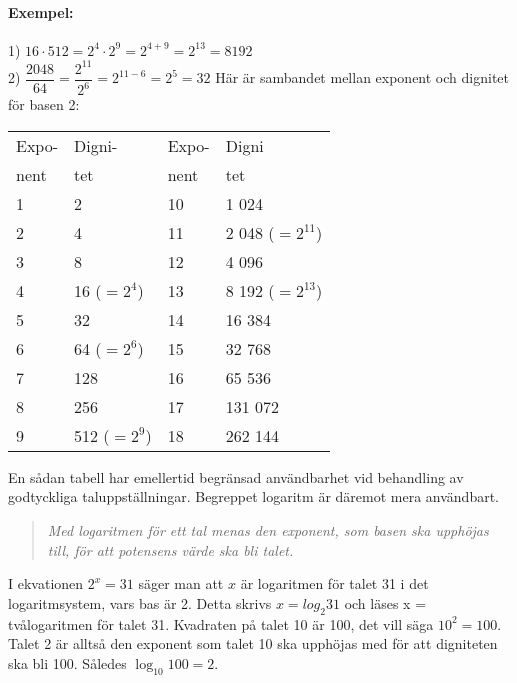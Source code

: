 \paragraph{Exempel:}
1) \(16 \cdot 512 = 2^4 \cdot 2^9 =2^{4+9} = 2^{13} = 8192\)\\
2) \(\dfrac{2048}{64} = \dfrac{2^{11}}{2^6} =2^{11-6} =2^5 = 32\)
Här är sambandet mellan exponent och dignitet för basen 2:

\begin{center}
\begin{tabular}{ll|ll}
Expo- & Digni-       & Expo- & Digni            \\
nent  & tet          & nent  & tet              \\ \hline
1     & 2            & 10    & 1 024            \\
2     & 4            & 11    & 2 048 (\(=2^{11}\)) \\
3     & 8            & 12    & 4 096            \\
4     & 16 (\(=2^4\))  & 13    & 8 192 (\(=2^{13}\)) \\
5     & 32           & 14    & 16 384           \\
6     & 64 (\(=2^6\))  & 15    & 32 768           \\
7     & 128          & 16    & 65 536           \\
8     & 256          & 17    & 131 072          \\
9     & 512 (\(=2^9\)) & 18    & 262 144
\end{tabular}
\end{center}

En sådan tabell har emellertid begränsad användbarhet vid behandling av
godtyckliga taluppställningar. Begreppet logaritm är däremot mera användbart.

\begin{quote}\emph{
Med logaritmen för ett tal menas den exponent, som basen ska upphöjas till,
för att potensens värde ska bli talet.
}\end{quote}

\begin{exempelbox}
I ekvationen \(2^x = 31\) säger man att \(x\) är logaritmen för talet 31 i det
logaritmsystem, vars bas är 2.
Detta skrivs \(x= log_2 31\) och läses x = tvålogaritmen för talet 31.
Kvadraten på talet 10 är 100, det vill säga \(10^2 = 100\).
Talet 2 är alltså den exponent som talet 10 ska upphöjas med för att digniteten
ska bli 100.
Således \(\log_{10}{100} = 2\).
\end{exempelbox}

